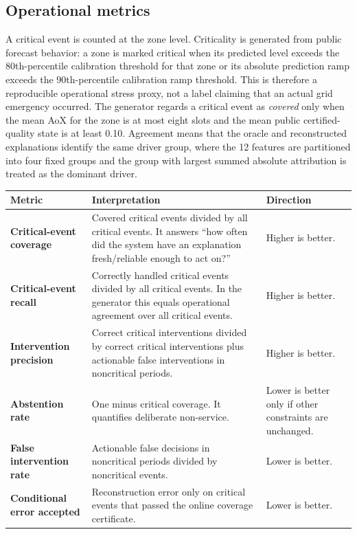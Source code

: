 \documentclass[11pt]{article}
\begin{document}
\subsection{Operational metrics}
A critical event is counted at the zone level. Criticality is generated from public forecast behavior: a zone is marked critical when its predicted level exceeds the 80th-percentile calibration threshold for that zone or its absolute prediction ramp exceeds the 90th-percentile calibration ramp threshold. This is therefore a reproducible operational stress proxy, not a label claiming that an actual grid emergency occurred. The generator regards a critical event as \emph{covered} only when the mean AoX for the zone is at most eight slots and the mean public certified-quality state is at least 0.10. Agreement means that the oracle and reconstructed explanations identify the same driver group, where the 12 features are partitioned into four fixed groups and the group with largest summed absolute attribution is treated as the dominant driver.
\begin{center}
\small
\begin{tabularx}{\textwidth}{>{\bfseries}p{} X p{}}
\toprule
Metric & Interpretation & Direction \\
\midrule
Critical-event coverage & Covered critical events divided by all critical events. It answers ``how often did the system have an explanation fresh/reliable enough to act on?'' & Higher is better. \\
Critical-event recall & Correctly handled critical events divided by all critical events. In the generator this equals operational agreement over all critical events. & Higher is better. \\
Intervention precision & Correct critical interventions divided by correct critical interventions plus actionable false interventions in noncritical periods. & Higher is better. \\
Abstention rate & One minus critical coverage. It quantifies deliberate non-service. & Lower is better only if other constraints are unchanged. \\
False intervention rate & Actionable false decisions in noncritical periods divided by noncritical events. & Lower is better. \\
Conditional error accepted & Reconstruction error only on critical events that passed the online coverage certificate. & Lower is better. \\
\bottomrule
\end{tabularx}
\end{center}
\end{document}
